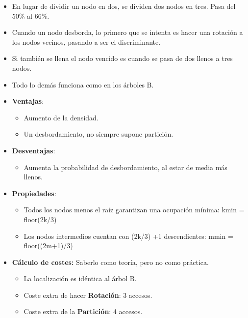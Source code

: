 \documentclass[12pt, twoside, openright]{report} %
\begin{document}
  \begin{itemize}
  \item En lugar de dividir un nodo en dos, se dividen dos nodos en tres.
    Pasa del 50\% al 66\%.
    
  \item Cuando un nodo desborda, lo primero que se intenta es hacer una
    rotación a los nodos vecinos, pasando a ser el discriminante.
    
  \item Si también se llena el nodo vencido es cuando se pasa de dos llenos
    a tres nodos.
    
  \item Todo lo demás funciona como en los árboles B.
    
  \item \textbf{Ventajas}:
    

    \begin{itemize}
    \item Aumento de la densidad.
      
    \item Un desbordamiento, no siempre supone partición.
      
    \end{itemize}
  \item \textbf{Desventajas}:
    

    \begin{itemize}
    \item Aumenta la probabilidad de desbordamiento, al estar de media más
      llenos.
      
    \end{itemize}
	\pagebreak
  \item \textbf{Propiedades}:
    

    \begin{itemize}
    \item Todos los nodos menos el raíz garantizan una ocupación mínima:
      kmin = floor(2k/3)
      
    \item Los nodos intermedios cuentan con (2k/3) +1 descendientes: mmin =
      floor((2m+1)/3)
      
    \end{itemize}
  \item \textbf{Cálculo de costes:} Saberlo como teoría, pero no como
    práctica.
    

    \begin{itemize}
    \item La localización es idéntica al árbol B.
      
    \item Coste extra de hacer \textbf{Rotación}: 3 accesos.
      
    \item Coste extra de la \textbf{Partición}: 4 accesos.
      
    \end{itemize}
  \end{itemize}
\end{document}

